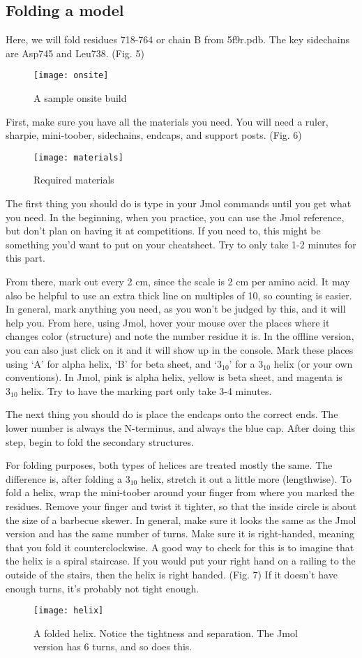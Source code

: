 \documentclass[twocolumn]{article}
\begin{document}
\subsection{Folding a model}
Here, we will fold residues 718-764 or chain B from 5f9r.pdb. The key sidechains are Asp745 and Leu738. (Fig. 5)
\begin{figure}[h!]
\caption{A sample onsite build}
\centering
\texttt{[image: onsite]}
\end{figure}

First, make sure you have all the materials you need. You will need a ruler, sharpie, mini-toober, sidechains, endcaps, and support posts. (Fig. 6)
\begin{figure}[h!]
\caption{Required materials}
\centering
\texttt{[image: materials]}
\end{figure}
The first thing you should do is type in your Jmol commands until you get what you need. In the beginning, when you practice, you can use the Jmol reference, but don't plan on having it at competitions. If you need to, this might be something you'd want to put on your cheatsheet. Try to only take 1-2 minutes for this part. 

From there, mark out every 2 cm, since the scale is 2 cm per amino acid. It may also be helpful to use an extra thick line on multiples of 10, so counting is easier. In general, mark anything you need, as you won't be judged by this, and it will help you. From here, using Jmol, hover your mouse over the places where it changes color (structure) and note the number residue it is. In the offline version, you can also just click on it and it will show up in the console. Mark these places using `A' for alpha helix, `B' for beta sheet, and `$3_{10}$' for a $3_{10}$ helix (or your own conventions). In Jmol, pink is alpha helix, yellow is beta sheet, and magenta is $3_{10}$ helix. Try to have the marking part only take 3-4 minutes. 

The next thing you should do is place the endcaps onto the correct ends. The lower number is always the N-terminus, and always the blue cap. After doing this step, begin to fold the secondary structures. 

For folding purposes, both types of helices are treated mostly the same. The difference is, after folding a $3_{10}$ helix, stretch it out a little more (lengthwise). To fold a helix, wrap the mini-toober around your finger from where you marked the residues. Remove your finger and twist it tighter, so that the inside circle is about the size of a barbecue skewer. In general, make sure it looks the same as the Jmol version and has the same number of turns. Make sure it is right-handed, meaning that you fold it counterclockwise. A good way to check for this is to imagine that the helix is a spiral staircase. If you would put your right hand on a railing to the outside of the stairs, then the helix is right handed. (Fig. 7) If it doesn't have enough turns, it's probably not tight enough. 
\begin{figure}[h!]
\caption{A folded helix. Notice the tightness and separation. The Jmol version has 6 turns, and so does this. }
\centering
\texttt{[image: helix]}
\end{figure}
\end{document}
